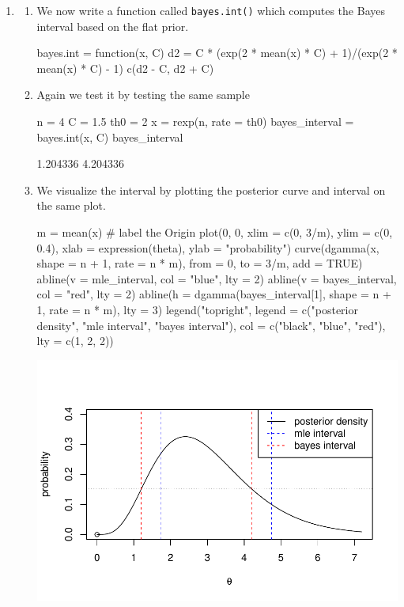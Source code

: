 \documentclass[12pt, a4paper]{article}\usepackage[]{graphicx}\usepackage[]{color}
\makeatletter
\def\maxwidth{ %
  \ifdim\Gin@nat@width>\linewidth
    \linewidth
  \else
    \Gin@nat@width
  \fi
}
\makeatother
\begin{document}
\begin{enumerate}[label={\bfseries\arabic*}]
\item 
  \begin{enumerate}[label=(\alph*)]
  \item We now write a function called \verb+bayes.int()+ which computes the Bayes interval based on the flat prior.
\begin{Schunk}
\begin{Sinput}
bayes.int = function(x, C) {
    d2 = C * (exp(2 * mean(x) * C) + 1)/(exp(2 * mean(x) * C) - 1)
    c(d2 - C, d2 + C)
}
\end{Sinput}
\end{Schunk}
  \item Again we test it by testing the same sample
\begin{Schunk}
\begin{Sinput}
n = 4
C = 1.5
th0 = 2
x = rexp(n, rate = th0)
bayes_interval = bayes.int(x, C)
bayes_interval
\end{Sinput}
\begin{Soutput}
[1] 1.204336 4.204336
\end{Soutput}
\end{Schunk}
  \item We visualize the interval by plotting the posterior curve and interval on the same plot. 
\begin{Schunk}
\begin{Sinput}
m = mean(x)
# label the Origin
plot(0, 0, xlim = c(0, 3/m), ylim = c(0, 0.4), xlab = expression(theta), ylab = "probability")
curve(dgamma(x, shape = n + 1, rate = n * m), from = 0, to = 3/m, add = TRUE)
abline(v = mle_interval, col = "blue", lty = 2)
abline(v = bayes_interval, col = "red", lty = 2)
abline(h = dgamma(bayes_interval[1], shape = n + 1, rate = n * m), lty = 3)
legend("topright", legend = c("posterior density", "mle interval", "bayes interval"), col = c("black",
    "blue", "red"), lty = c(1, 2, 2))
\end{Sinput}


{\centering \includegraphics[width=\maxwidth]{figure/unnamed-chunk-6-1} 

}
\end{Schunk}
\end{enumerate}
\end{enumerate}
\end{document}
